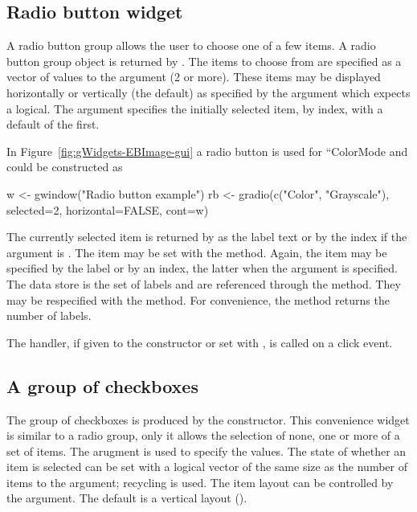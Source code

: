 \subsection{Radio button widget}
\label{sec:gWidgets-radio-button-widget}

A radio button group allows the user to choose one of a few
items. A radio button group object is returned by
. The items to choose from are specified as a
vector of values to the  argument (2 or more). These items
may be displayed horizontally or vertically (the default) as specified by the
 argument which expects a logical. The
 argument specifies the initially selected
item, by index,
with a default of the first.


In Figure~\ref{fig:gWidgets-EBImage-gui} a radio button is used for
``ColorMode  and could be constructed as

\begin{Schunk}
\begin{Sinput}
 w <- gwindow("Radio button example")
 rb <- gradio(c("Color", "Grayscale"), selected=2, horizontal=FALSE, cont=w)
\end{Sinput}
\end{Schunk}


The currently selected item is returned by  as
the label text or by the index if the argument  is
. The item may be set with the
 method. Again, the item may be
specified by the label or by an index, the latter when the argument
 is specified. The data store is the set of labels and
are referenced through the \method{[}{gradio} method. They may be respecified
with the
\method{[\ASSIGN}{gradio} method. For convenience, the
 method returns the number of labels.

The handler, if given to the constructor or set with , is called on a click event.

\subsection{A group of checkboxes}
\label{sec:gWidgets-group-checkboxes}


The group of checkboxes is produced by the
 constructor. This convenience widget is similar to a radio group,
only it allows the selection of none, one or more of a set of items.  The
 arugment is used to specify the
values. The state of whether an item is selected can be set with a
logical vector of the same size as the number of items to the
 argument; recycling is used. The
item layout can be controlled by the
 argument. The default is a
vertical layout ().


